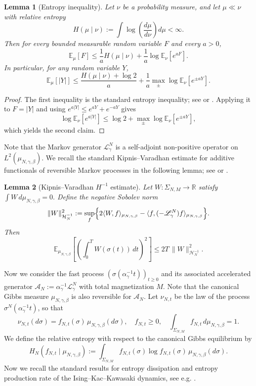 \documentclass{article}
\newtheorem{lemma}{Lemma}
\begin{document}
\begin{lemma}[Entropy inequality]
\label{lem:entropy-inequality}
Let \(\nu\) be a probability measure, and let \(\mu\ll\nu\) with relative entropy
\[
H(\mu\mid \nu):=\int \log\!\left(\frac{d\mu}{d\nu}\right)d\mu<\infty.
\]
Then for every bounded measurable random variable \(F\) and every \(a>0\),
\[
\mathbb E_\mu[F]
\le
\frac{1}{a}H(\mu\mid \nu)
+
\frac{1}{a}\log \mathbb E_\nu[e^{aF}].
\]
In particular, for any random variable \(Y\),
\[
\mathbb E_\mu[|Y|]
\le
\frac{H(\mu\mid \nu)+\log 2}{a}
+
\frac{1}{a}
\max_{\pm}
\log \mathbb E_\nu[e^{\pm aY}].
\]
\end{lemma}

\begin{proof}
The first inequality is the standard entropy inequality; see
\cite[Lemma~6.1.4]{KipnisLandim1999} or \cite[Section~2]{GPV88}.
Applying it to \(F=|Y|\) and using
\(
e^{a|Y|}\le e^{aY}+e^{-aY}
\)
gives
\[
\log \mathbb E_\nu[e^{a|Y|}]
\le
\log 2+\max_{\pm}\log \mathbb E_\nu[e^{\pm aY}],
\]
which yields the second claim.
\end{proof}

Note that the Markov generator \(\mathscr L_\gamma^{N}\) is a self-adjoint non-positive operator on \(L^2(\mu_{N,\gamma,\beta})\).
We recall the standard Kipnis--Varadhan estimate for additive functionals of reversible Markov processes in the following lemma; see \cite{KipnisVaradhan1986} or \cite[Chapter~2, Section~1]{KipnisLandim1999}. 

\begin{lemma}[Kipnis--Varadhan \(H^{-1}\) estimate]
\label{lem:KV-invariant}
Let \(W:\Sigma_{N,M}\to\mathbb R\) satisfy
\(
\int W\,d\mu_{N,\gamma,\beta}=0.
\)
Define the negative Sobolev norm
\begin{equation}\label{VCH-1}
    \|W\|_{\mathcal{H}^{-1}_N}^2 :=
\sup_f
\Bigl\{
2\langle W,f\rangle_{\mu_{N,\gamma,\beta}}
-
\langle f,(-\mathscr L_\gamma^{N})f\rangle_{\mu_{N,\gamma,\beta}}
\Bigr\}.
\end{equation}
Then
\[
\mathbb E_{\mu_{N,\gamma,\beta}}
\left[
\left(\int_0^T W(\sigma(t))\,dt\right)^2
\right]
\le
2T\,\|W\|_{\mathcal{H}^{-1}_N}^2.
\]
\end{lemma}

Now we consider the fast process \((\sigma(\alpha_\gamma^{-1}t))_{t\ge0}\) and its associated accelerated generator \(
\mathscr A_N:=\alpha_\gamma^{-1}\mathscr L_\gamma^N
\) with total magnetization $M$. 
Note that the canonical Gibbs measure \(\mu_{N,\gamma,\beta}\) is also reversible for \(\mathscr A_N\). 
Let \(\nu_{N,t}\) be the law of the process \(\sigma^N(\alpha^{-1}_{\gamma}t)\), so that
\[
\nu_{N,t}(d\sigma)=f_{N,t}(\sigma)\,\mu_{N,\gamma,\beta}(d\sigma),
\quad
f_{N,t}\ge0,
\quad
\int_{\Sigma_{N,M}} f_{N,t}\,d\mu_{N,\gamma,\beta}=1.
\]
We define the relative entropy with respect to the canonical Gibbs equilibrium by
\[
H_N(f_{N,t}\mid \mu_{N,\gamma,\beta})
:=
\int_{\Sigma_{N,M}}  f_{N,t}(\sigma)\log f_{N,t}(\sigma)\,\mu_{N,\gamma,\beta}(d\sigma).
\]
Now we recall the standard results for entropy dissipation and entropy production rate of the Ising--Kac--Kawasaki dynamics, see e.g. \cite{Funaki2018HydrodynamicLimitExclusion}.
\end{document}
